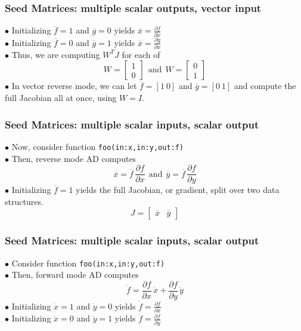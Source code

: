 \documentclass[compact,12pt]{beamer}
\newcommand{\prtl}[2]{\frac{\partial #1}{\partial #2}}
\begin{document}
\begin{frame}
\large\frametitle{Seed Matrices: multiple scalar outputs, vector input}
$\bullet$ Initializing $\overline{f} = 1$ and $\overline{g} = 0$ yields $\overline{x} = \prtl{f}{x}$\\
$\bullet$ Initializing $\overline{f} = 0$ and $\overline{g} = 1$ yields $\overline{x} = \prtl{g}{x}$\\
$\bullet$ Thus, we are computing $W^TJ$ for each of 
$$
W = \left[ \begin{array}{c}
     1  \\
     0 
\end{array}\right]\ \  \mbox{and}\ \ 
W = \left[ \begin{array}{c}
     0  \\
     1 
\end{array}\right]
$$
$\bullet$ In vector reverse mode, we can let  $\overline{f} = [1\ 0]$ and $\overline{g} = [0\ 1]$ and compute the full Jacobian all at once, using $W = I$.
\end{frame}

\begin{frame}
\large\frametitle{Seed Matrices: multiple scalar inputs, scalar output}
$\bullet$ Now, consider function \texttt{foo(in:x,in:y,out:f)}\\[0.5em]
$\bullet$ Then, reverse mode AD computes
$$
\overline{x} = \overline{f}\,\prtl{f}{x}\ \ \mbox{and}\ \  \overline{y} = \overline{f}\,\prtl{f}{y}
$$
$\bullet$ Initializing $\overline{f} = 1$ yields the full Jacobian, or gradient, split over two data structures.
$$
J = \left[ \begin{array}{cc}
     \overline{x} &
     \overline{y} 
\end{array} \right]
$$
\end{frame}


\begin{frame}
\large\frametitle{Seed Matrices: multiple scalar inputs, scalar output}
$\bullet$ Consider function \texttt{foo(in:x,in:y,out:f)}\\[0.5em]
$\bullet$ Then, forward mode AD computes
$$
\Dot{f} = \prtl{f}{x}\,\Dot{x} + \prtl{f}{y}\,\Dot{y}
$$
$\bullet$ Initializing $\Dot{x} = 1$ and $\Dot{y} = 0$ yields $\Dot{f} = \prtl{f}{x}$\\
$\bullet$ Initializing $\Dot{x} = 0$ and $\Dot{y} = 1$ yields $\Dot{f} = \prtl{f}{y}$\\
\end{frame}
\end{document}
